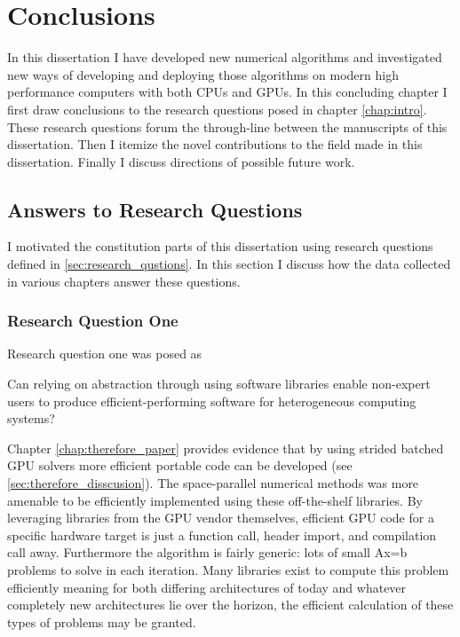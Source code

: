 
\chapter{Conclusions}
\label{chap:conclusion}


In this dissertation I have developed new numerical algorithms and investigated new ways of developing and deploying those algorithms on modern high performance computers with both CPUs and GPUs.
In this concluding chapter I first draw conclusions to the research questions posed in chapter \ref{chap:intro}.
These research questions forum the through-line between the manuscripts of this dissertation.
Then I itemize the novel contributions to the field made in this dissertation.
Finally I discuss directions of possible future work.

\section{Answers to Research Questions}

I motivated the constitution parts of this dissertation using research questions defined in \ref{sec:research_qustions}.
In this section I discuss how the data collected in various chapters answer these questions.

\subsection{Research Question One}

Research question one was posed as
\begin{displayquote}
Can relying on abstraction through using software libraries enable non-expert users to produce efficient-performing software for heterogeneous computing systems?
\end{displayquote}

Chapter \ref{chap:therefore_paper} provides evidence that by using strided batched GPU solvers more efficient portable code can be developed (see \ref{sec:therefore_disscusion}).
The space-parallel numerical methods was more amenable to be efficiently implemented using these off-the-shelf libraries.
By leveraging libraries from the GPU vendor themselves, efficient GPU code for a specific hardware target is just a function call, header import, and compilation call away.
Furthermore the algorithm is fairly generic: lots of small Ax=b problems to solve in each iteration.
Many libraries exist to compute this problem efficiently meaning for both differing architectures of today and whatever completely new architectures lie over the horizon, the efficient calculation of these types of problems may be granted.

